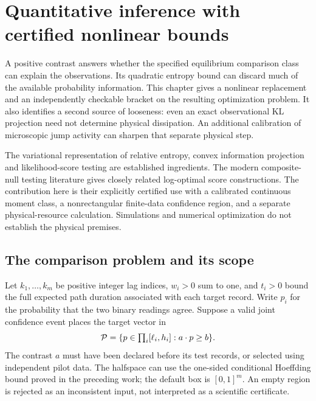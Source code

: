 \chapter{Quantitative inference with certified nonlinear bounds}
\label{chap:ci-nonlinear}

A positive contrast answers whether the specified equilibrium comparison class
can explain the observations. Its quadratic entropy bound can discard much of
the available probability information. This chapter gives a nonlinear replacement
and an independently checkable bracket on the resulting optimization problem.
It also identifies a second source of looseness: even an exact observational
KL projection need not determine physical dissipation. An additional calibration
of microscopic jump activity can sharpen that separate physical step.

The variational representation of relative entropy, convex information
projection and likelihood-score testing are established ingredients. The
modern composite-null testing literature gives closely related log-optimal
score constructions\cite{ciLarsson2025,ciGrunwald2024,ciLarsson2026}. The
contribution here is their explicitly certified use with a calibrated continuous
moment class, a nonrectangular finite-data confidence region, and a separate
physical-resource calculation. Simulations and numerical optimization do not
establish the physical premises.

\section{The comparison problem and its scope}
Let $k_1,\ldots,k_m$ be positive integer lag indices, $w_i>0$ sum to one, and
$t_i>0$ bound the full expected path duration associated with each target
record. Write $p_i$ for the probability that the two binary readings agree.
Suppose a valid joint confidence event places the target vector in
\[
 {\cal P}=\{p\in\textstyle\prod_i[\ell_i,h_i]:a\cdot p\ge b\}.
\]
The contrast $a$ must have been declared before its test records, or selected
using independent pilot data. The halfspace can use the one-sided conditional
Hoeffding bound proved in the preceding work; the default box is $[0,1]^m$.
An empty region is rejected as an inconsistent input, not interpreted as a
scientific certificate.

